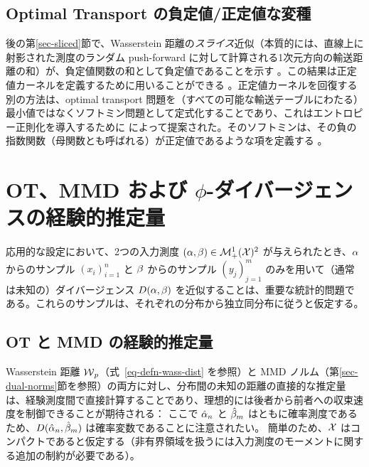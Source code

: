 \subsection{Optimal Transport の負定値/正定値な変種}

後の第\ref{sec-sliced}節で、Wasserstein 距離の\emph{スライス}近似（本質的には、直線上に射影された測度のランダム push-forward に対して計算される1次元方向の輸送距離の和）が、負定値関数の和として負定値であることを示す \citep[\S 3.1.11]{berg84harmonic}。この結果は正定値カーネルを定義するために用いることができる \citep{kolouri2016sliced}。正定値カーネルを回復する別の方法は、optimal transport 問題を（すべての可能な輸送テーブルにわたる）最小値ではなくソフトミン問題として定式化することであり、これはエントロピー正則化を導入するために \citet{kosowsky1994invisible} によって提案された。そのソフトミンは、その負の指数関数（母関数とも呼ばれる）が正定値であるような項を定義する \citep{cuturi2012positivity}。





\section{OT、MMD および $\phi$-ダイバージェンスの経験的推定量}
\label{sec-empirical-wass}

応用的な設定において、2つの入力測度 $(\alpha,\beta) \in \mathcal{M}_+^1(\mathcal{X})^2$ が与えられたとき、$\alpha$ からのサンプル $(x_i)_{i=1}^n$ と $\beta$ からのサンプル $(y_j)_{j=1}^m$ のみを用いて（通常は未知の）ダイバージェンス $D(\alpha,\beta)$ を近似することは、重要な統計的問題である。これらのサンプルは、それぞれの分布から独立同分布に従うと仮定する。

\subsection{OT と MMD の経験的推定量}

Wasserstein 距離 $\operatorname{\mathcal{W}}_p$（式~\ref{eq-defn-wass-dist} を参照）と MMD ノルム（第\ref{sec-dual-norms}節を参照）の両方に対し、分布間の未知の距離の直接的な推定量は、経験測度間で直接計算することであり、理想的には後者から前者への収束速度を制御できることが期待される：
ここで $\hat {\alpha}_n$ と $\hat {\beta}_m$ はともに確率測度であるため、$D(\hat {\alpha}_n,\hat {\beta}_m)$ は確率変数であることに注意されたい。
%
簡単のため、$\mathcal{X}$ はコンパクトであると仮定する（非有界領域を扱うには入力測度のモーメントに関する追加の制約が必要である）。

